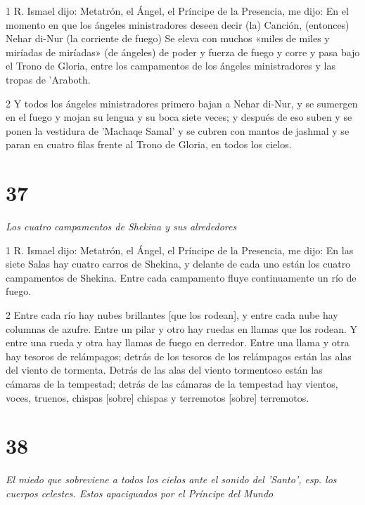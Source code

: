 \par 1 R. Ismael dijo: Metatrón, el Ángel, el Príncipe de la Presencia, me dijo: En el momento en que los ángeles ministradores deseen decir (la) Canción, (entonces) Nehar di-Nur (la corriente de fuego) Se eleva con muchos «miles de miles y miríadas de miríadas» (de ángeles) de poder y fuerza de fuego y corre y pasa bajo el Trono de Gloria, entre los campamentos de los ángeles ministradores y las tropas de 'Araboth.

\par 2 Y todos los ángeles ministradores primero bajan a Nehar di-Nur, y se sumergen en el fuego y mojan su lengua y su boca siete veces; y después de eso suben y se ponen la vestidura de 'Machaqe Samal' y se cubren con mantos de jashmal y se paran en cuatro filas frente al Trono de Gloria, en todos los cielos.


\chapter{37}

\par \textit{Los cuatro campamentos de Shekina y sus alrededores}

\par 1 R. Ismael dijo: Metatrón, el Ángel, el Príncipe de la Presencia, me dijo: En las siete Salas hay cuatro carros de Shekina, y delante de cada uno están los cuatro campamentos de Shekina. Entre cada campamento fluye continuamente un río de fuego.

\par 2 Entre cada río hay nubes brillantes [que los rodean], y entre cada nube hay columnas de azufre. Entre un pilar y otro hay ruedas en llamas que los rodean. Y entre una rueda y otra hay llamas de fuego en derredor. Entre una llama y otra hay tesoros de relámpagos; detrás de los tesoros de los relámpagos están las alas del viento de tormenta. Detrás de las alas del viento tormentoso están las cámaras de la tempestad; detrás de las cámaras de la tempestad hay vientos, voces, truenos, chispas [sobre] chispas y terremotos [sobre] terremotos.


\chapter{38}

\par \textit{El miedo que sobreviene a todos los cielos ante el sonido del 'Santo', esp. los cuerpos celestes. Estos apaciguados por el Príncipe del Mundo}

